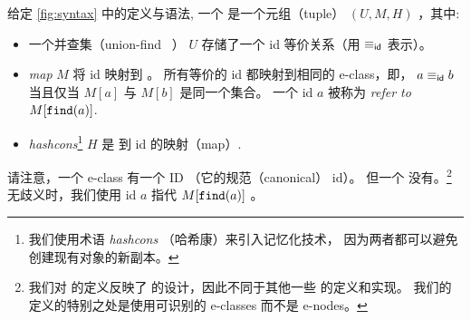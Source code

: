 % 
\begin{definition}
  \label{def:egraph}

  给定 \autoref{fig:syntax} 中的定义与语法,
  一个 \textit{\egraph} 是一个元组（tuple） $(U, M, H)$ ，其中:
  \begin{itemize}
    \item
    一个并查集（union-find ~\cite{unionfind}） $U$
      存储了一个 \eclass id 等价关系（用 $\equiv_{\sf id}$ 表示）。%
      
    \item
    \textit{\eclass map} $M$ 将 \eclass id 映射到 \eclasses。
    所有等价的 \eclass id 都映射到相同的 e-class，即，
    $a \equiv_{\sf id} b$ 当且仅当 $M[a]$ 与 $M[b]$ 是同一个集合。
    一个 \eclass id $a$ 被称为 
    \textit{refer to} \eclass $M[\texttt{find}(a)]$.  %

    \item \textit{hashcons}\footnote{
      我们使用术语 \textit{hashcons} （哈希康）来引入记忆化技术，
      因为两者都可以避免创建现有对象的新副本。 %
    }
    $H$ 是 \enodes 到 \eclass id 的映射（map）.
  \end{itemize}
   请注意，一个 e-class 有一个 ID （它的规范（canonical） \eclass id）。
   但一个 \enode 没有。\footnote{
    我们对 \egraph 的定义反映了 \egg 的设计，因此不同于其他一些 \egraph 的定义和实现。
    我们的定义的特别之处是使用可识别的 e-classes 而不是 e-nodes。
  }
  无歧义时，我们使用 \eclass id $a$ 指代 \eclass $M[\texttt{find}(a)]$ 。%

\end{definition}

